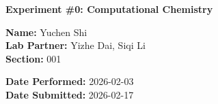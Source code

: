 \documentclass[12pt]{article}
\begin{document}
\begin{center}
    \Large \textbf{Experiment \#0: Computational Chemistry}
\end{center}
\vspace{0.5em}

\noindent
\begin{minipage}[t]{0.5\textwidth}
    \small
    \textbf{Name:} Yuchen Shi \\
    \textbf{Lab Partner:} Yizhe Dai, Siqi Li \\ 
    \textbf{Section:} 001 
\end{minipage}%
\begin{minipage}[t]{0.5\textwidth}
    \small \raggedleft
    \textbf{Date Performed:} 2026-02-03 \\ 
    \textbf{Date Submitted:} 2026-02-17 
\end{minipage}
\vspace{1.5em}
\end{document}
